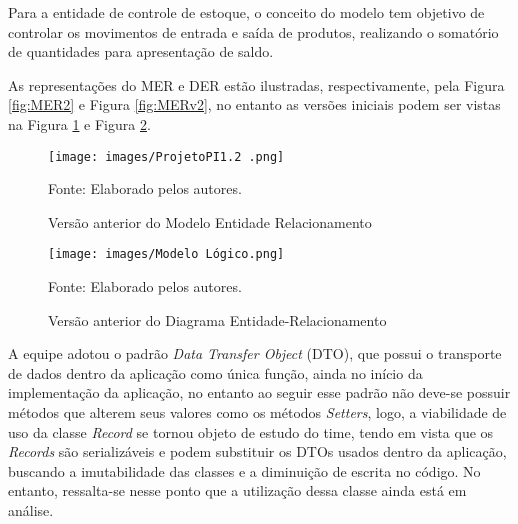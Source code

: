 \documentclass[
    12pt,               %
    openright,          %
    oneside,
    a4paper,            %
    BIBLATEX,           %
    TODO,               %
    english,            %
    brazil              %
    ]{ifsp-spo-inf-ctds}
\begin{document}
    Para a entidade de controle de estoque, o conceito do modelo tem objetivo de controlar os movimentos de entrada e saída de produtos, realizando o somatório de quantidades para apresentação de saldo.

    As representações do MER e DER  estão ilustradas, respectivamente, pela Figura \ref{fig:MER2} e Figura \ref{fig:MERv2}, no entanto as versões iniciais podem ser vistas na Figura \ref{fig:MER} e Figura \ref{fig:DER}.

    \begin{figure}[H]
        \centering
        \caption{Versão anterior do Modelo Entidade Relacionamento}
        \texttt{[image: images/ProjetoPI1.2 .png]}
                
        \label{fig:MER}
        \centering
        {\footnotesize Fonte: Elaborado pelos autores.}
    \end{figure}

    \begin{figure}[H]
        \centering
        \caption{Versão anterior do Diagrama Entidade-Relacionamento}
        \texttt{[image: images/Modelo Lógico.png]}
                
        \label{fig:DER}
        \centering
        {\footnotesize Fonte: Elaborado pelos autores.}
    \end{figure}

    A equipe adotou o padrão \emph{Data Transfer Object} (DTO), que possui o transporte de dados dentro da aplicação como única função, ainda no início da implementação da aplicação, no entanto ao seguir esse padrão não deve-se possuir métodos que alterem seus valores como os métodos \emph{Setters}, logo, a viabilidade de uso da classe \emph{Record} se tornou objeto de estudo do time, tendo em vista que os \emph{Records} são serializáveis e podem substituir os DTOs usados dentro da aplicação, buscando a imutabilidade das classes e a diminuição de escrita no código. No entanto, ressalta-se nesse ponto que a utilização dessa classe ainda está em análise.
\end{document}
